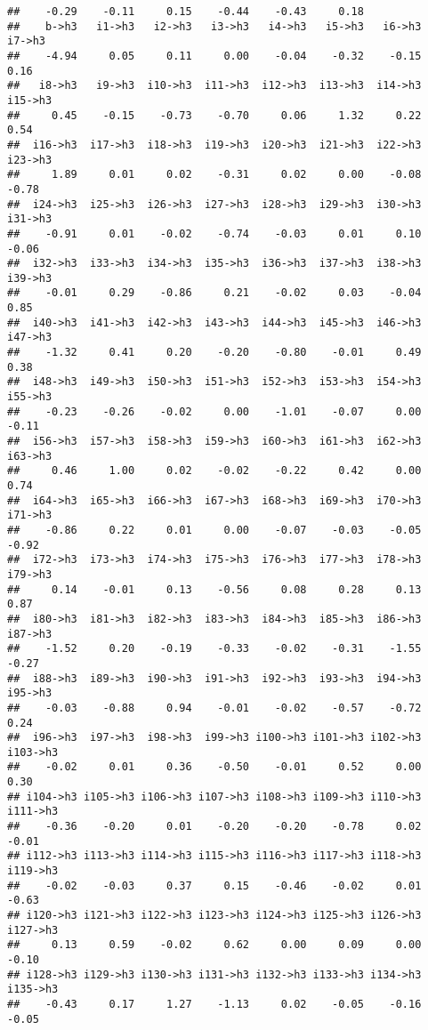 \documentclass[
]{article}
\begin{document}
\begin{verbatim}
##    -0.29    -0.11     0.15    -0.44    -0.43     0.18 
##    b->h3   i1->h3   i2->h3   i3->h3   i4->h3   i5->h3   i6->h3   i7->h3 
##    -4.94     0.05     0.11     0.00    -0.04    -0.32    -0.15     0.16 
##   i8->h3   i9->h3  i10->h3  i11->h3  i12->h3  i13->h3  i14->h3  i15->h3 
##     0.45    -0.15    -0.73    -0.70     0.06     1.32     0.22     0.54 
##  i16->h3  i17->h3  i18->h3  i19->h3  i20->h3  i21->h3  i22->h3  i23->h3 
##     1.89     0.01     0.02    -0.31     0.02     0.00    -0.08    -0.78 
##  i24->h3  i25->h3  i26->h3  i27->h3  i28->h3  i29->h3  i30->h3  i31->h3 
##    -0.91     0.01    -0.02    -0.74    -0.03     0.01     0.10    -0.06 
##  i32->h3  i33->h3  i34->h3  i35->h3  i36->h3  i37->h3  i38->h3  i39->h3 
##    -0.01     0.29    -0.86     0.21    -0.02     0.03    -0.04     0.85 
##  i40->h3  i41->h3  i42->h3  i43->h3  i44->h3  i45->h3  i46->h3  i47->h3 
##    -1.32     0.41     0.20    -0.20    -0.80    -0.01     0.49     0.38 
##  i48->h3  i49->h3  i50->h3  i51->h3  i52->h3  i53->h3  i54->h3  i55->h3 
##    -0.23    -0.26    -0.02     0.00    -1.01    -0.07     0.00    -0.11 
##  i56->h3  i57->h3  i58->h3  i59->h3  i60->h3  i61->h3  i62->h3  i63->h3 
##     0.46     1.00     0.02    -0.02    -0.22     0.42     0.00     0.74 
##  i64->h3  i65->h3  i66->h3  i67->h3  i68->h3  i69->h3  i70->h3  i71->h3 
##    -0.86     0.22     0.01     0.00    -0.07    -0.03    -0.05    -0.92 
##  i72->h3  i73->h3  i74->h3  i75->h3  i76->h3  i77->h3  i78->h3  i79->h3 
##     0.14    -0.01     0.13    -0.56     0.08     0.28     0.13     0.87 
##  i80->h3  i81->h3  i82->h3  i83->h3  i84->h3  i85->h3  i86->h3  i87->h3 
##    -1.52     0.20    -0.19    -0.33    -0.02    -0.31    -1.55    -0.27 
##  i88->h3  i89->h3  i90->h3  i91->h3  i92->h3  i93->h3  i94->h3  i95->h3 
##    -0.03    -0.88     0.94    -0.01    -0.02    -0.57    -0.72     0.24 
##  i96->h3  i97->h3  i98->h3  i99->h3 i100->h3 i101->h3 i102->h3 i103->h3 
##    -0.02     0.01     0.36    -0.50    -0.01     0.52     0.00     0.30 
## i104->h3 i105->h3 i106->h3 i107->h3 i108->h3 i109->h3 i110->h3 i111->h3 
##    -0.36    -0.20     0.01    -0.20    -0.20    -0.78     0.02    -0.01 
## i112->h3 i113->h3 i114->h3 i115->h3 i116->h3 i117->h3 i118->h3 i119->h3 
##    -0.02    -0.03     0.37     0.15    -0.46    -0.02     0.01    -0.63 
## i120->h3 i121->h3 i122->h3 i123->h3 i124->h3 i125->h3 i126->h3 i127->h3 
##     0.13     0.59    -0.02     0.62     0.00     0.09     0.00    -0.10 
## i128->h3 i129->h3 i130->h3 i131->h3 i132->h3 i133->h3 i134->h3 i135->h3 
##    -0.43     0.17     1.27    -1.13     0.02    -0.05    -0.16    -0.05 

\end{verbatim}
\end{document}
